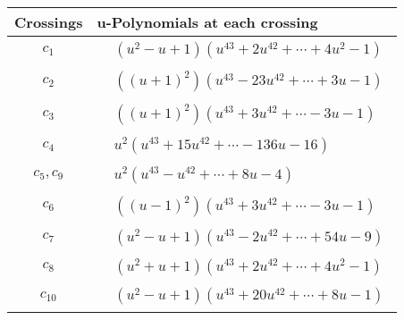 \documentclass[1p]{elsarticle_modified}
\theoremstyle{definition}
\begin{document}
\begin{tabular}{m{50pt}|m{274pt}}
Crossings & \hspace{64pt}u-Polynomials at each crossing \\
\hline $$\begin{aligned}c_{1}\end{aligned}$$&$\begin{aligned}
&(u^2- u+1)(u^{43}+2 u^{42}+\cdots+4 u^2-1)
\end{aligned}$\\
\hline $$\begin{aligned}c_{2}\end{aligned}$$&$\begin{aligned}
&((u+1)^2)(u^{43}-23 u^{42}+\cdots+3 u-1)
\end{aligned}$\\
\hline $$\begin{aligned}c_{3}\end{aligned}$$&$\begin{aligned}
&((u+1)^2)(u^{43}+3 u^{42}+\cdots-3 u-1)
\end{aligned}$\\
\hline $$\begin{aligned}c_{4}\end{aligned}$$&$\begin{aligned}
&u^2(u^{43}+15 u^{42}+\cdots-136 u-16)
\end{aligned}$\\
\hline $$\begin{aligned}c_{5},c_{9}\end{aligned}$$&$\begin{aligned}
&u^2(u^{43}- u^{42}+\cdots+8 u-4)
\end{aligned}$\\
\hline $$\begin{aligned}c_{6}\end{aligned}$$&$\begin{aligned}
&((u-1)^2)(u^{43}+3 u^{42}+\cdots-3 u-1)
\end{aligned}$\\
\hline $$\begin{aligned}c_{7}\end{aligned}$$&$\begin{aligned}
&(u^2- u+1)(u^{43}-2 u^{42}+\cdots+54 u-9)
\end{aligned}$\\
\hline $$\begin{aligned}c_{8}\end{aligned}$$&$\begin{aligned}
&(u^2+u+1)(u^{43}+2 u^{42}+\cdots+4 u^2-1)
\end{aligned}$\\
\hline $$\begin{aligned}c_{10}\end{aligned}$$&$\begin{aligned}
&(u^2- u+1)(u^{43}+20 u^{42}+\cdots+8 u-1)
\end{aligned}$\\
\hline
\end{tabular}\newpage\renewcommand{\arraystretch}{1}
\end{document}
